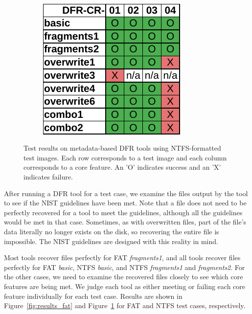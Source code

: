 \begin{figure}
\begin{subfigure}{0.3\linewidth}
    \end{subfigure}~~
    \begin{subfigure}{0.3\linewidth}
        \includegraphics[width=\linewidth]{fig/testdisk_results_ntfs.pdf}
    \end{subfigure}
        
    \caption{Test results on metadata-based DFR tools using NTFS-formatted test images. Each row corresponds to a test image and each column corresponds to a core feature. An 'O' indicates success and an 'X' indicates failure.}
    \label{fig:results_ntfs}
\end{figure}


After running a DFR tool for a test case, we examine the files output by the tool to see if the NIST guidelines have been met.
Note that a file does not need to be perfectly recovered for a tool to meet the guidelines, although all the guidelines would be met in that case.
Sometimes, as with overwritten files, part of the file's data literally no longer exists on the disk, so recovering the entire file is impossible.
The NIST guidelines are designed with this reality in mind.

Most tools recover files perfectly for FAT \emph{fragments1}, and all tools recover files perfectly for FAT \emph{basic}, NTFS \emph{basic}, and NTFS \emph{fragments1} and \emph{fragments2}.
For the other cases, we need to examine the recovered files closely to see which core features are being met.
We judge each tool as either meeting or failing each core feature individually for each test case.
Results are shown in Figure~\ref{fig:results_fat} and Figure~\ref{fig:results_ntfs} for FAT and NTFS test cases, respectively.


